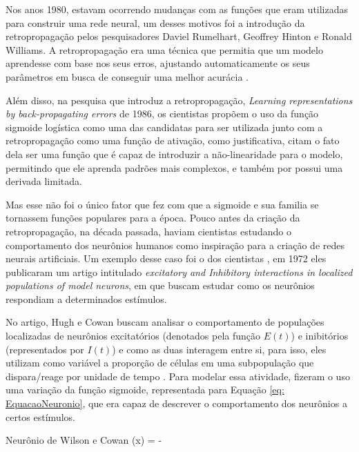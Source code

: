 Nos anos 1980, estavam ocorrendo mudanças com as funções que eram utilizadas para construir uma rede neural, um desses motivos foi a introdução da retropropagação pelos pesquisadores Daviel Rumelhart, Geoffrey Hinton e Ronald Williams. A retropropagação era uma técnica que permitia que um modelo aprendesse com base nos seus erros, ajustando automaticamente os seus parâmetros em busca de conseguir uma melhor acurácia \parencite{BackpropagationArticle}. 

Além disso, na pesquisa que introduz a retropropagação, \textit{Learning representations by back-propagating errors} de 1986, os cientistas propõem o uso da função sigmoide logística como uma das candidatas para ser utilizada junto com a retropropagação como uma função de ativação, como justificativa, \textcite{BackpropagationArticle} citam o fato dela ser uma função que é capaz de introduzir a não-linearidade para o modelo, permitindo que ele aprenda padrões mais complexos, e também por possui uma derivada limitada.

Mas esse não foi o único fator que fez com que a sigmoide e sua familia se tornassem funções populares para a época. Pouco antes da criação da retropropagação, na década passada, haviam cientistas estudando o comportamento dos neurônios humanos como inspiração para a criação de redes neurais artificiais. Um exemplo desse caso foi o dos cientistas \textcite{SigmoidWilsonCowan}, em 1972 eles publicaram um artigo intitulado \textit{excitatory and Inhibitory interactions in localized populations of model neurons}, em que buscam estudar como os neurônios respondiam a determinados estímulos.

No artigo, Hugh e Cowan buscam analisar o comportamento de populações localizadas de neurônios excitatórios (denotados pela função $E(t)$) e inibitórios (representados por $I(t)$) e como as duas interagem entre si, para isso, eles utilizam como variável a proporção de células em uma subpopulação que dispara/reage por unidade de tempo \parencite{SigmoidWilsonCowan}. Para modelar essa atividade, \textcite{SigmoidWilsonCowan} fizeram o uso uma variação da função sigmoide, representada para Equação \ref{eq: EquacaoNeuronio}, que era capaz de descrever o comportamento dos neurônios a certos estímulos.

\begin{equacaodestaque}{Neurônio de Wilson e Cowan}
    (x) =  - 
    \label{eq:neuronio-de-wilson-cowan}
\end{equacaodestaque}


